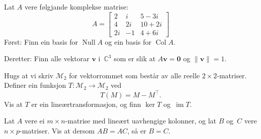 \documentclass[titlepage,a4paper,12pt,nynorsk]{IMFeksamen}
\newcommand{\C}{\mathbb{C}}
\newcommand{\M}{\mathcal{M}} %
\DeclareMathOperator{\Null}{Null}
\DeclareMathOperator{\Col}{Col}
\DeclareMathOperator{\im}{im}
\newcommand{\tr}{^\top}
\newcommand{\V}[1]{\mathbf{#1}}
\newcommand{\vvv}[3]{\begin{bmatrix} #1 \\ #2 \\ #3 \end{bmatrix}}
\renewcommand{\v}{\V{v}}
\newcommand{\0}{\V{0}}
\begin{document}
\begin{oppgave}
Lat $A$ vere følgjande komplekse matrise:
\[
A =
\begin{bmatrix}
2  &  i &  5 - 3i \\
4  & 2i & 10 + 2i \\
2i & -1 &  4 + 6i
\end{bmatrix}
\]
Først: Finn ein basis for $\Null A$ og ein basis for $\Col A$.

Deretter: Finn alle vektorar $\v$ i~$\C^3$ som er slik at
$A\v = \0$
og
$\| \v \| = 1$.
\end{oppgave}


\begin{oppgave}
Hugs at vi skriv $\M_2$ for vektorrommet som består av alle reelle
$2 \times 2$-matriser.
Definer ein funksjon $T \colon \M_2 \to \M_2$ ved
\[
T(M) = M - M\tr.
\]
Vis at $T$ er ein lineærtransformasjon, og finn $\ker T$ og~$\im T$.
\end{oppgave}


\begin{oppgave}
Lat $A$ vere ei $m \times n$-matrise med lineært uavhengige kolonner,
og lat $B$ og~$C$ vere $n \times p$-matriser.
Vis at dersom $AB = AC$, så er $B = C$.
\end{oppgave}
\end{document}
